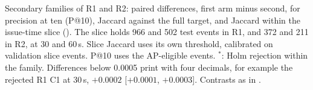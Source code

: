 \begin{table}[h]
\footnotesize
\centering
\caption{Secondary families of R1 and R2: paired differences, first arm minus second, for precision at ten (P@10), Jaccard against the full target, and Jaccard within the issue-time slice (). The slice holds \num{966} and 502 test events in R1, and 372 and 211 in R2, at 30 and 60\,s. Slice Jaccard uses its own threshold, calibrated on validation slice events. P@10 uses the AP-eligible events. $^{*}$: Holm rejection within the family. Differences below 0.0005 print with four decimals, for example the rejected R1 C1 at 30\,s, $+0.0002$ [$+0.0001$, $+0.0003$]. Contrasts as in .}
\label{tab:secondary}
\setlength{\tabcolsep}{2.5pt}

\end{table}

